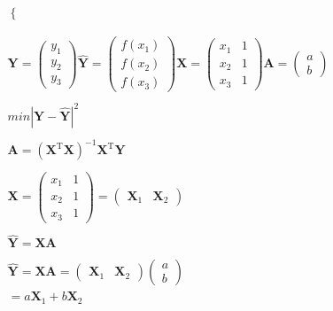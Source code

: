 \documentclass{article}
\begin{document}
\begin{equation}
\begin{aligned}
\begin{cases}
        \end{cases} \\
        \\
        \\
        \mathbf{Y}=\begin{pmatrix}
            y_1\\y_2\\y_3
        \end{pmatrix}
        \mathbf{\hat{Y}}=\begin{pmatrix} f(x_1)\\f(x_2)\\f(x_3) \end{pmatrix}
        \mathbf{X}=\begin{pmatrix}
            x_1&1\\
            x_2&1\\
            x_3&1
        \end{pmatrix}
        \mathbf{A}=\begin{pmatrix}
            a\\b
        \end{pmatrix}\\  
        \\
        min |\mathbf{Y}-\mathbf{\hat{Y}}|^2      \\
        \\
        \mathbf{A}=(\mathbf{X}^\mathrm{T}\mathbf{X})^{-1}\mathbf{X}^\mathrm{T}\mathbf{Y}\\
        \\
        \mathbf{X}=\begin{pmatrix}
            x_1&1\\
            x_2&1\\
            x_3&1
        \end{pmatrix}=\begin{pmatrix}
            \mathbf{X}_1&\mathbf{X}_2
        \end{pmatrix}\\
        \\
        \mathbf{\hat{Y}}=\mathbf{X}\mathbf{A}\\
        \\
        \mathbf{\hat{Y}}=\mathbf{X}\mathbf{A}=\begin{pmatrix}
            \mathbf{X}_1&\mathbf{X}_2
        \end{pmatrix}\begin{pmatrix}
            a\\b
        \end{pmatrix}\\=a\mathbf{X}_1+b\mathbf{X}_2\\

\end{aligned}
\end{equation}
\end{document}
